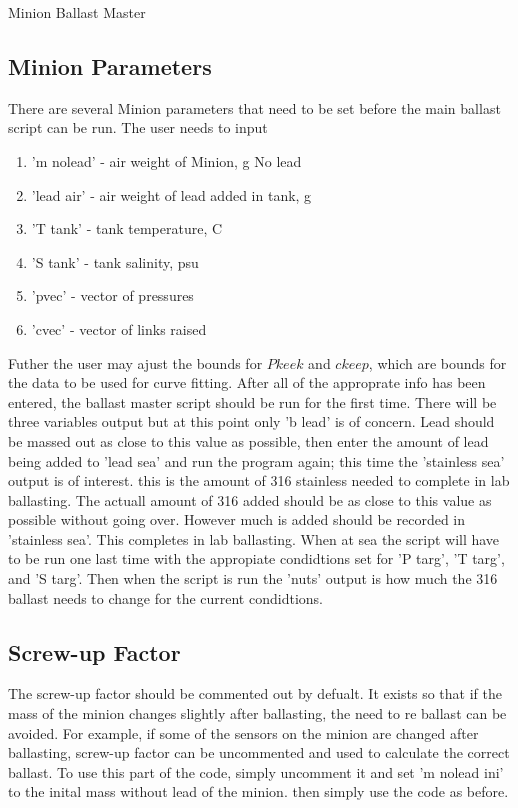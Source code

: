 \documentclass[11pt]{article}
\theoremstyle{break}
\begin{document}
\begin{section}{Minion Ballast Master}
    \subsection{Minion Parameters}
        There are several Minion parameters that need to be set before the main ballast script can be run. 
        The user needs to input 
        \begin{enumerate}
            \item 'm nolead' - air weight of Minion, g No lead 
            \item 'lead air' - air weight of lead added in tank, g
            \item 'T tank' - tank temperature, C 
            \item 'S tank' - tank salinity, psu 
            \item 'pvec' - vector of pressures 
            \item 'cvec' - vector of links raised   
        \end{enumerate}

        Futher the user may ajust the bounds for $Pkeek$ and $ckeep$, which 
        are bounds for the data to be used for curve fitting. After all of the 
        approprate info has been entered, the ballast master script should be run 
        for the first time. There will be three variables output but at this point 
        only 'b lead' is of concern. Lead should be massed out as close to this value as 
        possible, then enter the amount of lead being added to 'lead sea' and run the program 
        again; this time the 'stainless sea' output is of interest. this is the amount of 
        316 stainless needed to complete in lab ballasting. The actuall amount of 316 added should 
        be as close to this value as possible without going over. However much is added should be 
        recorded in 'stainless sea'. This completes in lab ballasting. When at sea the script will 
        have to be run one last time with the appropiate condidtions set for 'P targ', 'T targ',  and 'S targ'.
        Then when the script is run the 'nuts' output is how much the 316 ballast needs to change 
        for the current condidtions. 
        
    \subsection{Screw-up Factor}
        The screw-up factor should be commented out by defualt. It exists so that if the mass 
        of the minion changes slightly after ballasting, the need to re ballast can be avoided. 
        For example, if some of the sensors on the minion are changed after ballasting, screw-up factor 
        can be uncommented and used to calculate the correct ballast. To use this part of the code, 
        simply uncomment it and set 'm nolead ini' to the inital mass without lead of the minion. 
        then simply use the code as before. 
    
\end{section}
\end{document}

